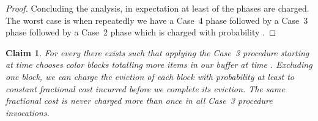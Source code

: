 \documentclass[12pt]{article}
\newtheorem{claim}[theorem]{Claim}
\begin{document}
\begin{proof}
Concluding the analysis, in expectation at least  
of the phases are charged. The worst case is when repeatedly
we have a Case~4 phase followed by a Case~3 phase followed
by a Case~2 phase which is charged with probability . 
\end{proof}

\begin{claim}\label{cl: case 3 procedure}
For every  there exists  
such that applying the Case~3 procedure starting at time 
chooses color blocks totalling more  items in our buffer 
at time . Excluding one block, we can charge the eviction
of each block with probability at least  to constant
fractional cost incurred before we complete its eviction. The
same fractional cost is never charged more than once in all
Case~3 procedure invocations.
\end{claim}
\end{document}
